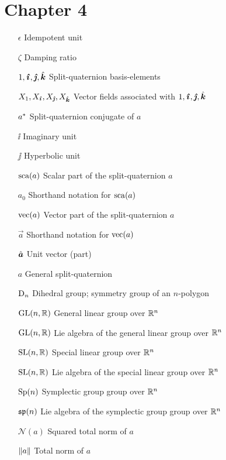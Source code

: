 \section*{Chapter 4}
\begin{itemize}[itemsep=0pt, leftmargin=3.4cm, labelsep=0cm, labelwidth=3.3cm, align=left]
    \item[$\epsilon$] Idempotent unit
    \item[$\zeta$] Damping ratio
%
    \item[$1,\quati,\quatj,\quatk$] Split-quaternion basis-elements
    \item[$X_1, X_{\quati}, X_{\quatj}, X_{\quatk}$] Vector fields associated with $1, \quati, \quatj, \quatk$
    \item[$a^*$] Split-quaternion conjugate of $a$
    \item[$\ii$] Imaginary unit
    \item[$\jj$] Hyperbolic unit
    \item[$\mathrm{sca}\qty(a)$] Scalar part of the split-quaternion $a$
    \item[$a_0$] Shorthand notation for $\mathrm{sca}\qty(a)$
    \item[$\mathrm{vec}\qty(a)$] Vector part of the split-quaternion $a$
    \item[$\vec{a}$] Shorthand notation for $\mathrm{vec}\qty(a)$
    \item[$\uvec{a}$] Unit vector (part)
    \item[$a$] General split-quaternion
%
%
    \item[$\mathrm{D}_n$] Dihedral group; symmetry group of an $n$-polygon
    \item[$\mathrm{GL}(n, \mathbb{R})$] General linear group over $\mathbb{R}^n$
    \item[$\mathrm{GL}(n, \mathbb{R})$] Lie algebra of the general linear group over $\mathbb{R}^n$
    \item[$\mathrm{SL}(n, \mathbb{R})$] Special linear group over $\mathbb{R}^n$
    \item[$\mathrm{SL}(n, \mathbb{R})$] Lie algebra of the special linear group over $\mathbb{R}^n$
    \item[$\mathrm{Sp}(n)$] Symplectic group group over $\mathbb{R}^n$
    \item[$\mathfrak{sp}(n)$] Lie algebra of the symplectic group group over $\mathbb{R}^n$
%
    \item[$\mathscr{N}(a)$]  Squared total norm of $a$
    \item[$\norm{a}$]  Total norm of $a$

\end{itemize}
